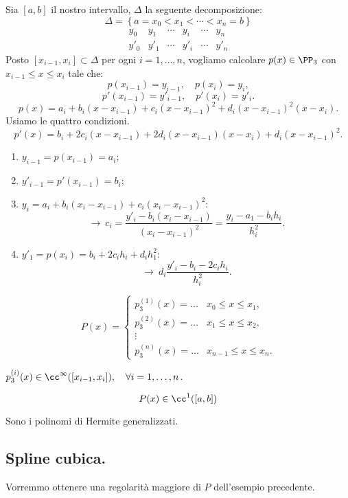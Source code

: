 \begin{exe}
Sia $[a,b]$ il nostro intervallo, $\Delta$ la seguente decomposizione:
\[\Delta = \left\{a = x_0 < x_1 < \cdots < x_n = b\right\}\]
\[\begin{array}{ccccccc}
y_0 & y_1 & \cdots &y_i &\cdots & y_n  \\
y'_0 & y'_1 & \cdots &y'_i &\cdots & y'_n  
\end{array}\]
Posto $[x_{i-1}, x_i] \subset \Delta$ per ogni $i = 1, \ldots, n$, vogliamo 
calcolare $p(x) \in \PP_3$ con $x_{i-1}\leq x \leq x_i$ tale che:
\[
p(x_{i-1}) = y_{i-1}, \quad p(x_i) = y_i,
\]
\[
p'(x_{i-1}) = y'_{i-1}, \quad p'(x_i) = y'_i.
\]
\[
p(x) = a_i + b_i(x-x_{i-1})+ c_i(x-x_{i-1})^2 + d_i(x-x_{i-1})^2(x-x_i).
\]
Usiamo le quattro condizioni.
\[
p'(x) = b_i + 2c_i(x-x_{i-1}) + 2d_i(x-x_{i-1})(x-x_i)+ d_i(x-x_{i-1})^2.
\]
\begin{enumerate}
\item $y_{i-1} = p(x_{i-1}) = a_i$;
\item $y'_{i-1} = p'(x_{i-1}) = b_i$;
\item $y_i = a_i + b_i(x_i-x_{i-1})+ c_i(x_i-x_{i-1})^2$:
\[\longrightarrow \ c_i = \frac{y'_i -b_i(x_i-x_{i-1})}{(x_i-x_{i-1})^2}
= \frac{y_i -a_1 -b_i h_i}{h^2_i}.\]
\item $y'_1 = p(x_i) = b_i + 2c_i h_i + d_i h^2_1$:
\[\longrightarrow \ d_i \frac{y'_i - b_i - 2 c_i h_i}{h^2_i}.\]
\end{enumerate}

\[
P(x) = \left \{
\begin{array}{lc}
p_3^{(1)}(x) = \ldots & x_0 \leq x \leq x_1, \\
p_3^{(2)}(x) = \ldots & x_1 \leq x \leq x_2,\\
\vdots \\
p_3^{(n)}(x) = \ldots & x_{n-1} \leq x \leq x_n .
\end{array}\right.
\]

$p_3^{(i)}(x) \in \cc^\infty([x_{i-1}, x_i]), \quad \forall i = 1, \ldots,n$.

\[
P(x) \in \cc^1([a,b])
\]

Sono i polinomi di Hermite generalizzati.
\end{exe}

\subsection{Spline cubica.}
Vorremmo ottenere una regolarità maggiore di $P$ dell'esempio precedente.

